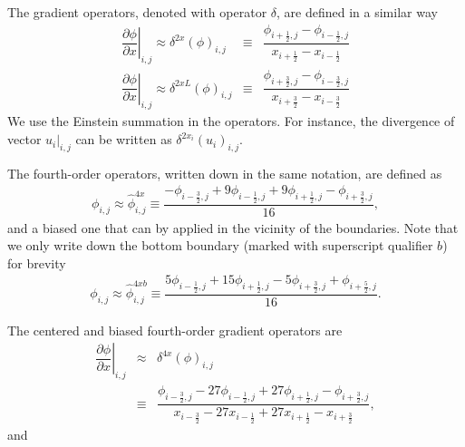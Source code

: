\documentclass[gmd]{copernicus}
\begin{document}
The gradient operators, denoted with operator $\delta$, are defined in a similar way
\begin{eqnarray}
\left. \dfrac{\partial \phi}{\partial x}\right|_{i,j} \approx \delta^{2x} \left( \phi \right)_{i,j} & \equiv & \dfrac{\phi_{i+\frac{1}{2},j} - \phi_{i-\frac{1}{2},j}}
                                                                                                                 {   x_{i+\frac{1}{2}}   -    x_{i-\frac{1}{2}  }} \\
\left. \dfrac{\partial \phi}{\partial x}\right|_{i,j} \approx \delta^{2xL} \left( \phi \right)_{i,j}& \equiv & \dfrac{\phi_{i+\frac{3}{2},j} - \phi_{i-\frac{3}{2},j}}
                                                                                                                  {   x_{i+\frac{3}{2}}   -    x_{i-\frac{3}{2}  }}
\end{eqnarray}
We use the Einstein summation in the operators. For instance, the divergence of vector $\left.u_i\right|_{i,j}$ can be written as $\delta^{2x_i}\left( u_i \right)_{i,j}$.
% 

The fourth-order operators, written down in the same notation, are defined as
\begin{eqnarray}
\phi_{i,j} \approx \widehat{\phi}^{4x}_{i,j} \equiv \dfrac{- \phi_{i-\frac{3}{2},j} + 9 \phi_{i-\frac{1}{2},j} + 9 \phi_{i+\frac{1}{2},j} - \phi_{i+\frac{3}{2},j}}{16},\label{eq:interp4}
\end{eqnarray}
and a biased one that can by applied in the vicinity of the boundaries. Note that we only write down the bottom boundary (marked with superscript qualifier $b$) for brevity
\begin{eqnarray}
\phi_{i,j} \approx \widehat{\phi}^{4xb}_{i,j} \equiv \dfrac{ 5 \phi_{i-\frac{1}{2},j} + 15 \phi_{i+\frac{1}{2},j} - 5 \phi_{i+\frac{3}{2},j} + \phi_{i+\frac{5}{2},j}}{16}.
\end{eqnarray}

The centered and biased fourth-order gradient operators are
\begin{eqnarray}
\nonumber
\left. \dfrac{\partial \phi}{\partial x}\right|_{i,j} & \approx & \delta^{4x} \left( \phi \right)_{i,j}\\
& \equiv & \dfrac{\phi_{i-\frac{3}{2},j} - 27 \phi_{i-\frac{1}{2},j} + 27 \phi_{i+\frac{1}{2},j} - \phi_{i+\frac{3}{2},j}}
             {       x_{i-\frac{3}{2}}   - 27    x_{i-\frac{1}{2}}   + 27    x_{i+\frac{1}{2}}   -    x_{i+\frac{3}{2}}},
\end{eqnarray}
and
\end{document}
